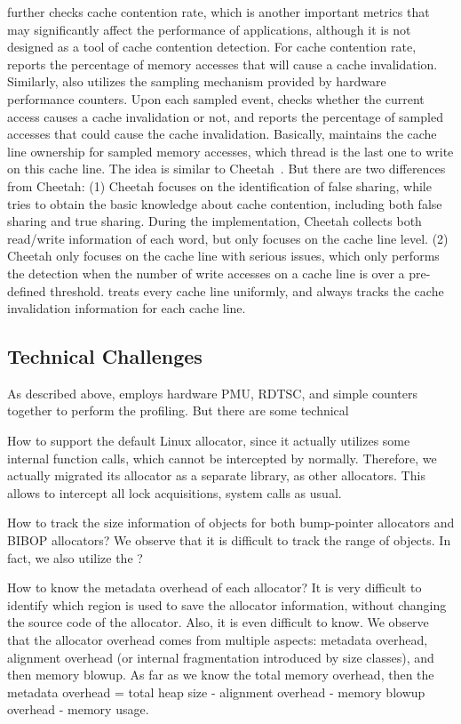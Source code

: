 \MP{} further checks cache contention rate, which is another important metrics that may significantly affect the performance of applications, although it is not designed as a tool of cache contention detection. For cache contention rate, \MP{} reports the percentage of memory accesses that will cause a cache invalidation.  Similarly, \MP{} also utilizes the sampling mechanism provided by hardware performance counters. Upon each sampled event, \MP{} checks whether the current access causes a cache invalidation or not, and reports the percentage of sampled accesses that could cause the cache invalidation. Basically, \MP{} maintains the cache line ownership for sampled memory accesses, which thread is the last one to write on this cache line. The idea is similar to Cheetah~\cite{Cheetah}. But there are two differences from Cheetah: (1) Cheetah focuses on the identification of false sharing, while \MP{} tries to obtain the basic knowledge about cache contention, including both false sharing and true sharing. During the implementation, Cheetah collects both read/write information of each word, but \MP{} only focuses on the cache line level. (2)  Cheetah only focuses on the cache line with serious issues, which only performs the detection when the number of write accesses on a cache line is over a pre-defined threshold. \MP{} treats every cache line uniformly, and always tracks the cache invalidation information for each cache line. 

\subsection{Technical Challenges}

As described above, \MP{} employs hardware PMU, RDTSC, and simple counters together to perform the profiling. But there are some technical 
 

How to support the default Linux allocator, since it actually utilizes some internal function calls, which cannot be intercepted by \MP{} normally. Therefore, we actually migrated its allocator as a separate library, as other allocators. This allows \MP{} to intercept all lock acquisitions, system calls as usual. 

How to track the size information of objects for both bump-pointer allocators and BIBOP allocators? We observe that it is difficult to track the range of objects. In fact, we also utilize the ?

How to know the metadata overhead of each allocator? It is very difficult to identify which region is used to save the allocator information, without changing the source code of the allocator. Also, it is even difficult to know. We observe that the allocator overhead comes from multiple aspects: metadata overhead, alignment overhead (or internal fragmentation introduced by size classes), and then memory blowup. 
As far as we know the total memory overhead, then the metadata overhead = total heap size - alignment overhead - memory blowup overhead - memory usage.

